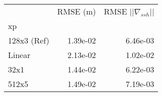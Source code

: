 \begin{tabular}{lrr}
\toprule
 & RMSE (m) & RMSE $|| \nabla_{ssh} ||$ \\
xp &  &  \\
\midrule
128x3 (Ref) & 1.39e-02 & 6.46e-03 \\
Linear & 2.13e-02 & 1.02e-02 \\
32x1 & 1.44e-02 & 6.22e-03 \\
512x5 & 1.49e-02 & 7.19e-03 \\
\bottomrule
\end{tabular}

